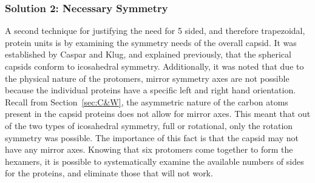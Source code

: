 \documentclass[12pt,letter]{article}
\begin{document}
\subsubsection{Solution 2: Necessary Symmetry}
A second technique for justifying the need for 5 sided, and therefore trapezoidal, protein units is by examining the symmetry needs of the overall capsid. It was established by Caspar and Klug, and explained previously, that the spherical capsids conform to icosahedral symmetry. Additionally, it was noted that due to the physical nature of the protomers, mirror symmetry axes are not possible because the individual proteins have a specific left and right hand orientation. Recall from Section~\ref{sec:C&W}, the asymmetric nature of the carbon atoms present in the capsid proteins does not allow for mirror axes. This meant that out of the two types of icosahedral symmetry, full or rotational, only the rotation symmetry was possible. The importance of this fact is that the capsid may not have any mirror axes. Knowing that six protomers come together to form the hexamers, it is possible to systematically examine the available numbers of sides for the proteins, and eliminate those that will not work. 
\end{document}
